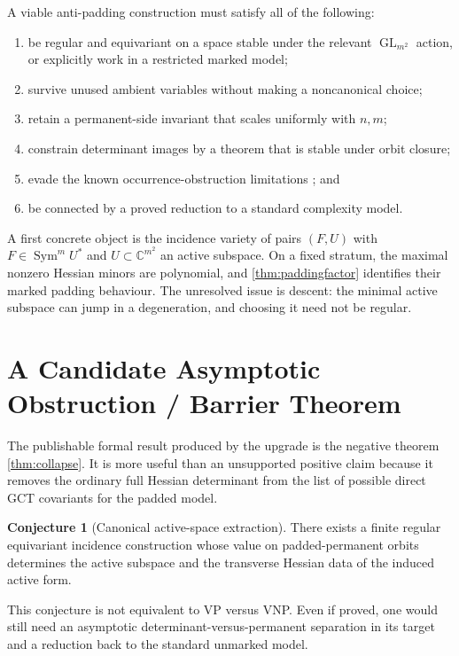 \documentclass[11pt]{article}
\theoremstyle{definition}
\newtheorem{conjecture}[theorem]{Conjecture}
\theoremstyle{remark}
\newcommand{\C}{\mathbb C}
\newcommand{\Sym}{\operatorname{Sym}}
\newcommand{\GL}{\operatorname{GL}}
\begin{document}
A viable anti-padding construction must satisfy all of the following:
\begin{enumerate}[leftmargin=2em]
\item be regular and equivariant on a space stable under the relevant
$\GL_{m^2}$ action, or explicitly work in a restricted marked model;
\item survive unused ambient variables without making a noncanonical choice;
\item retain a permanent-side invariant that scales uniformly with $n,m$;
\item constrain determinant images by a theorem that is stable under orbit
closure;
\item evade the known occurrence-obstruction limitations
\cite{IP2017,BIP2019}; and
\item be connected by a proved reduction to a standard complexity model.
\end{enumerate}

A first concrete object is the incidence variety of pairs $(F,U)$ with
$F\in\Sym^mU^*$ and $U\subset\C^{m^2}$ an active subspace.  On a fixed stratum,
the maximal nonzero Hessian minors are polynomial, and
\cref{thm:paddingfactor} identifies their marked padding behaviour.  The
unresolved issue is descent: the minimal active subspace can jump in a
 degeneration, and choosing it need not be regular.

\section{A Candidate Asymptotic Obstruction / Barrier Theorem}

The publishable formal result produced by the upgrade is the negative theorem
\cref{thm:collapse}.  It is more useful than an unsupported positive claim
because it removes the ordinary full Hessian determinant from the list of
possible direct GCT covariants for the padded model.

\begin{conjecture}[Canonical active-space extraction]\label{conj:active}
There exists a finite regular equivariant incidence construction whose value on
padded-permanent orbits determines the active subspace and the transverse
Hessian data of the induced active form.
\end{conjecture}
This conjecture is not equivalent to VP versus VNP.  Even if proved, one would
still need an asymptotic determinant-versus-permanent separation in its target
and a reduction back to the standard unmarked model.
\end{document}
